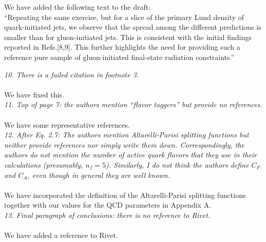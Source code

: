 \documentclass[a4paper,11pt]{article}
\begin{document}
We have added the following text to the draft:
\\

``Repeating the same exercise, but for a slice of the primary Lund density of quark-initiated jets, we observe that the spread among the different predictions is smaller than for gluon-initiated jets. This is consistent with the initial findings reported in Refs.[8,9]. This further highlights the need for providing such a reference pure sample of gluon-initiated final-state radiation constraints.''

\noindent\textit{10. There is a failed citation in footnote 3.}
\\
\\
We have fixed this.
\\

\noindent\textit{11. Top of page 7: the authors mention “flavor taggers” but provide no references.
}
\\
\\
We have some representative references.
\\

\noindent\textit{12. After Eq. 2.7: The authors mention Altarelli-Parisi splitting functions but neither provide references nor simply write them down. Correspondingly, the authors do not mention the number of active quark flavors that they use in their calculations (presumably, $n_f=5$). Similarly, I do not think the authors define $C_F$​ and $C_A$​, even though in general they are well known.}
\\
\\
We have incorporated the definition of the Altarelli-Parisi splitting functions together with our values for the QCD parameters in Appendix A.
\\

\noindent\textit{13. Final paragraph of conclusions: there is no reference to Rivet.}
\\
\\
We have added a reference to Rivet.
\\
\end{document}
